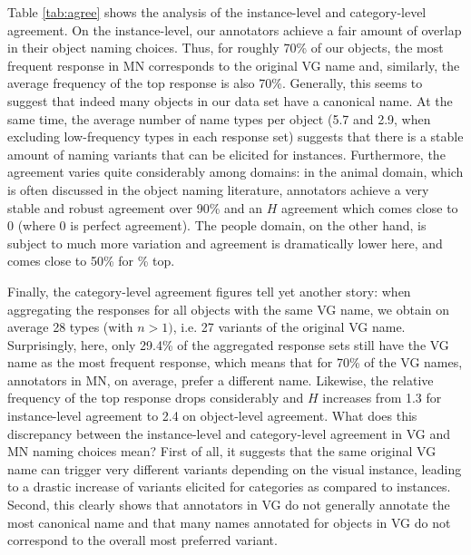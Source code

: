 Table \ref{tab:agree} shows the analysis of the instance-level and category-level agreement.
On the instance-level, our annotators achieve a fair amount of overlap in their object naming choices. Thus, for roughly 70\% of our objects, the most frequent response in MN corresponds to the original VG name and, similarly, the average frequency of the top response is also 70\%. Generally, this seems to suggest that indeed many objects in our data set have a canonical name. At the same time, the average number of name types per object (5.7 and 2.9, when excluding low-frequency types in each response set) suggests that there is a stable amount of naming variants that can be elicited for instances. Furthermore, the agreement varies quite considerably among domains:  in the animal domain, which is often discussed in the object naming literature, annotators achieve a very stable and robust agreement over 90\% and an $H$ agreement which comes close to 0 (where 0 is perfect agreement). 
The people domain, on the other hand, is subject to much more variation and agreement is dramatically lower here, and comes close to 50\% for \% top.

Finally, the category-level agreement figures tell yet another story: when aggregating the responses for all objects with the same VG name, we obtain on average 28 types (with $n > 1)$, i.e. 27 variants of the original VG name. Surprisingly, here, only 29.4\% of the aggregated response sets still have the VG name as the most frequent response, which means that for 70\% of the VG names, annotators in MN, on average, prefer a different name.  Likewise, the relative frequency of the top response drops considerably and $H$ increases from 1.3 for instance-level agreement to 2.4 on object-level agreement.  
What does this discrepancy between the instance-level and category-level agreement in VG and MN naming choices mean? First of all, it suggests that the same original VG name can trigger very different variants depending on the visual instance, leading to a drastic increase of variants elicited for categories as compared to instances. Second, this clearly shows that annotators in VG do not generally annotate the most canonical name and that many names annotated for objects in VG do not correspond to the overall most preferred variant. 


